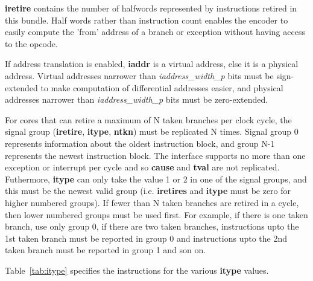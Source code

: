 \textbf {iretire} contains the number of halfwords represented by
instructions retired in this bundle. Half words rather than
instruction count enables the encoder to easily compute the 'from'
address of a branch or exception without having access to the opcode.

If address translation is enabled, \textbf {iaddr} is a virtual
address, else it is a physical address. Virtual addresses narrower
than \textit{iaddress\_width\_p} bits must be sign-extended to make
computation of differential addresses easier, and physical addresses
narrower than \textit{iaddress\_width\_p} bits must be zero-extended.

For cores that can retire a maximum of N taken branches per clock
cycle, the signal group (\textbf{iretire}, \textbf{itype},
\textbf{ntkn}) must be replicated N times. Signal group 0
represents information about the oldest instruction block, and group N-1
represents the newest instruction block. The interface supports no more
than one exception or interrupt per cycle and so \textbf{cause} and
\textbf{tval} are not replicated. Futhermore, \textbf{itype} can only
take the value 1 or 2 in one of the signal groups, and this must be
the newest valid group (i.e. \textbf{iretires} and \textbf{itype} must
be zero for higher numbered groups). If fewer than N taken branches
are retired in a cycle, then lower numbered groups must be used
first. For example, if there is one taken branch, use only group 0, if
there are two taken branches, instructions upto the 1st taken branch
must be reported in group 0 and instructions upto the 2nd taken branch
must be reported in group 1 and son on.

Table~\ref{tab:itype} specifies the instructions for the various \textbf{itype} values.

